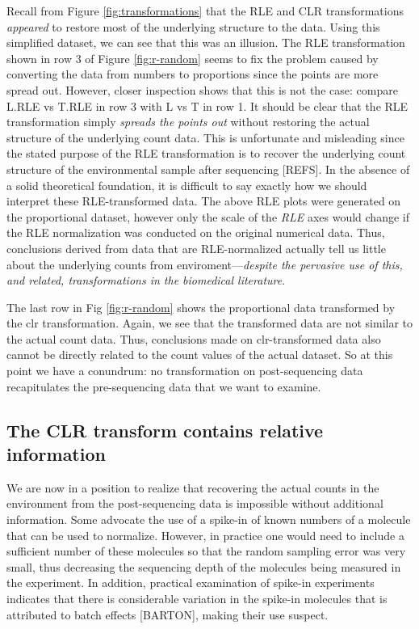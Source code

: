 \documentclass[
  onecolumn]{article}
\begin{document}
Recall from Figure \ref{fig:transformations} that the RLE and CLR transformations \emph{appeared} to restore most of the underlying structure to the data. Using this simplified dataset, we can see that this was an illusion. The RLE transformation shown in row 3 of Figure \ref{fig:r-random} seems to fix the problem caused by converting the data from numbers to proportions since the points are more spread out. However, closer inspection shows that this is not the case: compare L.RLE vs T.RLE in row 3 with L vs T in row 1. It should be clear that the RLE transformation simply \emph{spreads the points out} without restoring the actual structure of the underlying count data. This is unfortunate and misleading since the stated purpose of the RLE transformation is to recover the underlying count structure of the environmental sample after sequencing {[}REFS{]}. In the absence of a solid theoretical foundation, it is difficult to say exactly how we should interpret these RLE-transformed data. The above RLE plots were generated on the proportional dataset, however only the scale of the \emph{RLE} axes would change if the RLE normalization was conducted on the original numerical data. Thus, conclusions derived from data that are RLE-normalized actually tell us little about the underlying counts from enviroment---\emph{despite the pervasive use of this, and related, transformations in the biomedical literature}.

The last row in Fig \ref{fig:r-random} shows the proportional data transformed by the clr transformation. Again, we see that the transformed data are not similar to the actual count data. Thus, conclusions made on clr-transformed data also cannot be directly related to the count values of the actual dataset. So at this point we have a conundrum: no transformation on post-sequencing data recapitulates the pre-sequencing data that we want to examine.

\hypertarget{the-clr-transform-contains-relative-information}{%
\subsection{The CLR transform contains relative information}\label{the-clr-transform-contains-relative-information}}

We are now in a position to realize that recovering the actual counts in the environment from the post-sequencing data is impossible without additional information. Some advocate the use of a spike-in of known numbers of a molecule that can be used to normalize. However, in practice one would need to include a sufficient number of these molecules so that the random sampling error was very small, thus decreasing the sequencing depth of the molecules being measured in the experiment. In addition, practical examination of spike-in experiments indicates that there is considerable variation in the spike-in molecules that is attributed to batch effects {[}BARTON{]}, making their use suspect.
\end{document}
